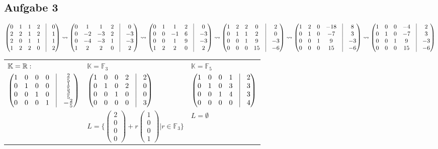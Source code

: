\documentclass[a4paper,twoside,DIV15,BCOR12mm]{scrbook}
\renewcommand{\K}{\ensuremath{\mathbb{K}}}
\renewcommand{\F}{\ensuremath{\mathbb{F}}}
\providecommand{\matr}[1]{\begin{pmatrix}#1\end{pmatrix}}
\begin{document}
\subsection{Aufgabe 3}
$
\matr{0&1&1&2&\vrule&0\\2&2&1&2&\vrule&1\\2&0&1&1&\vrule&1\\1&2&2&0&\vrule&2}\leadsto
\matr{0&1&1&2&\vrule&0\\0&-2&-3&2&\vrule&-3\\0&-4&-3&1&\vrule&-3\\1&2&2&0&\vrule&2}\leadsto
\matr{0&1&1&2&\vrule&0\\0&0&-1&6&\vrule&-3\\0&0&1&9&\vrule&-3\\1&2&2&0&\vrule&2}\leadsto
\matr{1&2&2&0&\vrule&2\\0&1&1&2&\vrule&0\\0&0&1&9&\vrule&-3\\0&0&0&15&\vrule&-6}\leadsto
\matr{1&2&0&-18&\vrule&8\\0&1&0&-7&\vrule&3\\0&0&1&9&\vrule&-3\\0&0&0&15&\vrule&-6}\leadsto
\matr{1&0&0&-4&\vrule&2\\0&1&0&-7&\vrule&3\\0&0&1&9&\vrule&-3\\0&0&0&15&\vrule&-6}
$\par
\begin{tabular}{lll}$\K=\MdR:$ & $\K=\F_3$ & $\K=\F_5$\\
$\matr{1&0&0&0&\vrule&\frac25\\0&1&0&0&\vrule&\frac15\\0&0&1&0&\vrule&\frac35\\0&0&0&1&\vrule&-\frac25}$ &
$\matr{1&0&0&2&\vrule&2\\0&1&0&2&\vrule&0\\0&0&1&0&\vrule&0\\0&0&0&0&\vrule&3}$ &
$\matr{1&0&0&1&\vrule&2\\0&1&0&3&\vrule&3\\0&0&1&4&\vrule&3\\0&0&0&0&\vrule&4}$\\
& $L=\{\matr{2\\0\\0\\0}+r\matr{1\\0\\0\\1}| r\in\F_3\}$ & $L=\emptyset$
\end{tabular}
\end{document}
